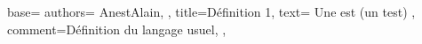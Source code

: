 {
  base={
    authors={
      AnestAlain,
    },
    title=Définition 1,
    text={
      Une  est (un test)
    },
    comment={Définition du langage usuel},
  },
}
